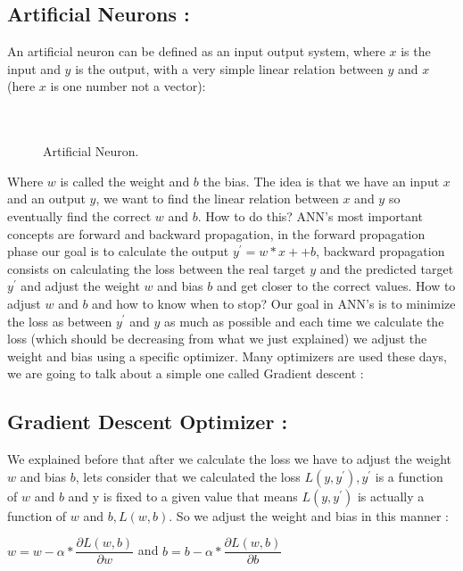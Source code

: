 \documentclass[10pt,a4paper]{article}
\begin{document}
\subsection{Artificial Neurons :}
An artificial neuron can be defined as an input output system, where $ x $ is the input and $ y $ is the output, with a very simple linear relation between $ y $ and $ x $ (here $ x $ is one number not a vector):\\\\\\
\begin{figure}[H]
\centering
{}
\caption{Artificial Neuron.}
\end{figure}
Where $ w $ is called the weight and $ b $ the bias. The idea is that we have an input $ x $ and an output $ y $, we want to find the linear relation between $ x $ and $ y $ so eventually find the correct $ w $ and $ b $. How to do this? ANN's most important concepts are forward and backward propagation, in the forward propagation phase our goal is to calculate the output $ y^{\prime} = w*x ++ b $, backward propagation consists on calculating the loss between the real target $ y $ and the predicted target $ y^{\prime} $ and adjust the weight $ w $ and bias $ b $ and get closer to the correct values. How to adjust $ w $ and $ b $ and how to know when to stop? Our goal in ANN's is to minimize the loss as between $ y^{\prime} $ and $ y $ as much as possible and each time we calculate the loss (which should be decreasing from what we just explained) we adjust the weight and bias using a specific optimizer. Many optimizers are used these days, we are going to talk about a simple one called Gradient descent :
\subsection{Gradient Descent Optimizer :}
We explained before that after we calculate the loss we have to adjust the weight $ w $ and bias $ b $, lets consider that we calculated the loss $ L(y,y^{\prime}), y^{\prime} $ is a function of $ w $ and $ b $ and y is fixed to a given value that means $ L(y,y^{\prime}) $ is actually a function of $ w $ and $ b, L(w,b) $. So we adjust the weight and bias in this manner :\\
\begin{center}
$ w = w - \alpha*\dfrac{\partial L(w,b)}{\partial w} $ \hspace{1cm} and \hspace{1cm} $ b = b - \alpha*\dfrac{\partial L(w,b)}{\partial b} $
\end{center} 
\end{document}
